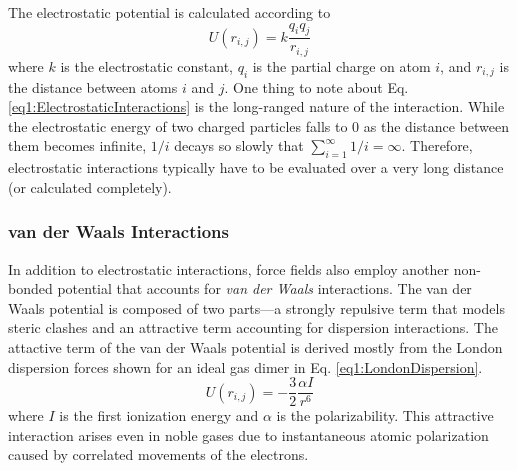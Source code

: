 The electrostatic potential is calculated according to
\begin{equation}
   U (r_{i,j}) = k \frac {q_i q_j} {r_{i,j}}
   \label{eq1:ElectrostaticInteractions}
\end{equation}
where $k$ is the electrostatic constant, $q_i$ is the partial charge on atom
$i$, and $r_{i,j}$ is the distance between atoms $i$ and $j$. One thing to note
about Eq. \ref{eq1:ElectrostaticInteractions} is the long-ranged nature of the
interaction. While the electrostatic energy of two charged particles falls to 0
as the distance between them becomes infinite, $1 / i$ decays so slowly that
$\sum _ {i=1}^{\infty} 1 / i = \infty$. Therefore, electrostatic interactions
typically have to be evaluated over a very long distance (or calculated
completely).

\subsubsection{van der Waals Interactions}
\label{sec1:MMVDW}

In addition to electrostatic interactions, force fields also employ another
non-bonded potential that accounts for \emph{van der Waals} interactions. The
van der Waals potential is composed of two parts---a strongly repulsive term
that models steric clashes and an attractive term accounting for dispersion
interactions.  The attactive term of the van der Waals potential is derived
mostly from the London dispersion forces shown for an ideal gas dimer in Eq.
\ref{eq1:LondonDispersion}. \cite{McQuarrie_Book_PhysChem_1997}
\begin{equation}
   U(r_{i,j}) = - \frac 3 2 \frac {\alpha I} {r ^ 6}
   \label{eq1:LondonDispersion}
\end{equation}
where $I$ is the first ionization energy and $\alpha$ is the polarizability.
This attractive interaction arises even in noble gases due to instantaneous
atomic polarization caused by correlated movements of the electrons.


